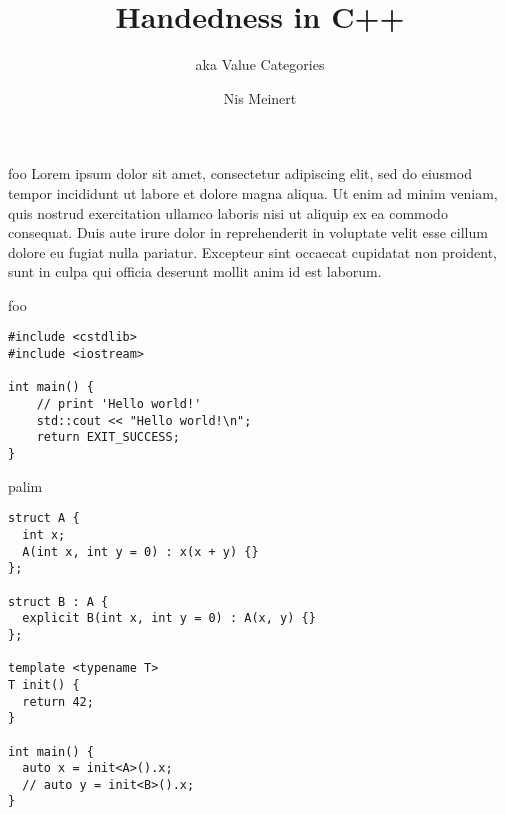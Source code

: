 \documentclass[compress,aspectratio=1610]{beamer}
\title{Handedness in C++}
\subtitle{aka Value Categories}
\institute{iCSC 2019}
\author{Nis Meinert}
\begin{document}
\maketitle

\begin{frame}{foo}
    Lorem ipsum dolor sit amet, consectetur adipiscing elit, sed do eiusmod tempor incididunt ut labore et dolore magna aliqua. Ut enim ad minim veniam, quis nostrud exercitation ullamco laboris nisi ut aliquip ex ea commodo consequat. Duis aute irure dolor in reprehenderit in voluptate velit esse cillum dolore eu fugiat nulla pariatur. Excepteur sint occaecat cupidatat non proident, sunt in culpa qui officia deserunt mollit anim id est laborum.
\end{frame}

\begin{frame}[fragile]{foo}
    \begin{lstlisting}[title=\href{https://godbolt.org/z/Zn3yoq}{\texttt{godbolt.org/z/Zn3yoq}}]
#include <cstdlib>
#include <iostream>

int main() {
    // print 'Hello world!'
    std::cout << "Hello world!\n";
    return EXIT_SUCCESS;
}
    \end{lstlisting}
\end{frame}

\begin{frame}[fragile]{palim}
    \begin{lstlisting}[title=\href{https://godbolt.org/z/Zn3yoq}{\texttt{godbolt.org/z/Zn3yoq}}]
struct A {
  int x;
  A(int x, int y = 0) : x(x + y) {}
};

struct B : A {
  explicit B(int x, int y = 0) : A(x, y) {}
};

template <typename T>
T init() {
  return 42;
}

int main() {
  auto x = init<A>().x;
  // auto y = init<B>().x;
}
    \end{lstlisting}
\end{frame}
\end{document}
